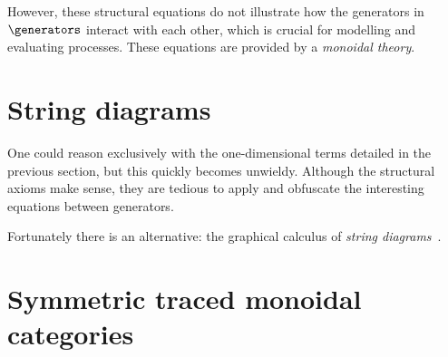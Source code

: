 However, these structural equations do not illustrate how the generators in
\(\generators\) interact with each other, which is crucial for modelling and
evaluating processes.
These equations are provided by a \emph{monoidal theory}.



\section{String diagrams}

One could reason exclusively with the one-dimensional terms detailed in the
previous section, but this quickly becomes unwieldy.
Although the structural axioms make sense, they are tedious to apply and
obfuscate the interesting equations between generators.

Fortunately there is an alternative: the graphical calculus of
\emph{string diagrams}~\cite{joyal1991geometry}.

\section{Symmetric traced monoidal categories}